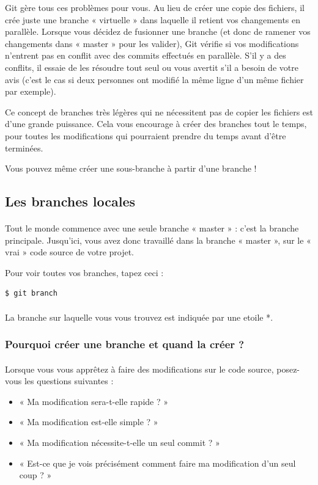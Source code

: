 \documentclass[french, a4paper, 12pt, titlepage]{article}
\begin{document}
Git gère tous ces problèmes pour vous. Au lieu de créer une copie des fichiers, il crée juste une branche « virtuelle » dans laquelle il retient vos changements en parallèle. Lorsque vous décidez de fusionner une branche (et donc de ramener vos changements dans « master » pour les valider), Git vérifie si vos modifications n’entrent pas en conflit avec des commits effectués en parallèle. S’il y a des conflits, il essaie de les résoudre tout seul ou vous avertit s’il a besoin de votre avis (c’est le cas si deux personnes ont modifié la même ligne d’un même fichier par exemple).

Ce concept de branches très légères qui ne nécessitent pas de copier les fichiers est d’une grande puissance. Cela vous encourage à créer des branches tout le temps, pour toutes les modifications qui pourraient prendre du temps avant d’être terminées.

Vous pouvez même créer une sous-branche à partir d’une branche !


\subsection{Les branches locales}
\paragraph{}Tout le monde commence avec une seule branche « master » : c’est la branche principale. Jusqu’ici, vous avez donc travaillé dans la branche « master », sur le « vrai » code source de votre projet.

Pour voir toutes vos branches, tapez ceci :
\begin{lstlisting}
$ git branch
\end{lstlisting}

\paragraph{}La branche sur laquelle vous vous trouvez est indiquée par une etoile *.

\subsubsection{Pourquoi créer une branche et quand la créer ?}
\paragraph{}Lorsque vous vous apprêtez à faire des modifications sur le code source, posez-vous les questions suivantes :
\begin{itemize}
\item « Ma modification sera-t-elle rapide ? »
\item « Ma modification est-elle simple ? » 
\item « Ma modification nécessite-t-elle un seul commit ? »
\item « Est-ce que je vois précisément comment faire ma modification d’un seul coup ? »
\end{itemize}
\end{document}
